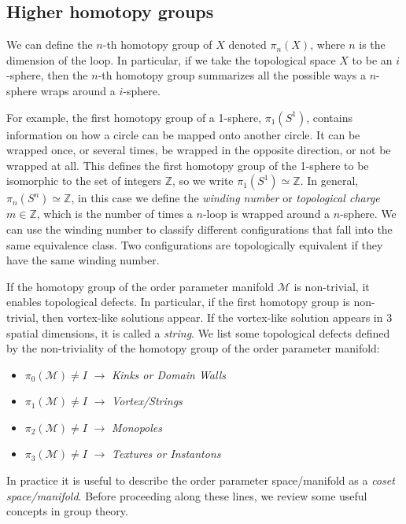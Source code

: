 \subsection{Higher homotopy groups}\label{sec:homgroup}
We can define the $n$-th homotopy group of $X$ denoted $\pi_n(X)$, where $n$ is the dimension of the loop. In particular, if we take the topological space $X$ to be an $i$-sphere, then the $n$-th homotopy group summarizes all the possible ways a $n$-sphere wraps around a $i$-sphere.

For example, the first homotopy group of a 1-sphere, $\pi_1(S^1)$, contains information on how a circle can be mapped onto another circle. It can be wrapped once, or several times, be wrapped in the opposite direction, or not be wrapped at all. This defines the first homotopy group of the 1-sphere to be isomorphic to the set of integers $\mathbb{Z}$, so we write $\pi_1(S^1) \simeq \mathbb{Z}$. In general, $\pi_n(S^n) \simeq \mathbb{Z}$, in this case we define the \textit{winding number} or \textit{topological charge} $m\in \mathbb{Z}$, which is the number of times a $n$-loop is wrapped around a $n$-sphere. We can use the winding number to classify different configurations that fall into the same equivalence class. Two configurations are topologically equivalent if they have the same winding number.

If the homotopy group of the order parameter manifold $\mathcal{M}$ is non-trivial, it enables topological defects. In particular, if the first homotopy group is non-trivial, then vortex-like solutions appear. If the vortex-like solution appears in 3 spatial dimensions, it is called a \textit{string}. We list some topological defects defined by the non-triviality of the homotopy group of the order parameter manifold:

\begin{itemize}
\item $\pi_0(\mathcal{M}) \neq I$ $\to$ \textit{Kinks or  Domain Walls}
\item $\pi_1(\mathcal{M}) \neq I$ $\to$ \textit{Vortex/Strings}
\item $\pi_2(\mathcal{M}) \neq I$ $\to$ \textit{Monopoles}
\item $\pi_3(\mathcal{M}) \neq I$ $\to$ \textit{Textures or Instantons}
\end{itemize}

In practice it is useful to describe the order parameter space/manifold as a \textit{coset space/manifold}. Before proceeding along these lines, we review some useful concepts in group theory.

